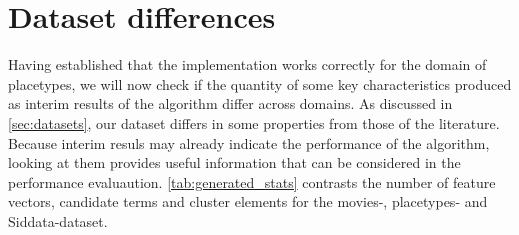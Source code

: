 \begin{table}[H]
	\label{tab:f1_geonames_foursquare_all}
\end{table}






\vspace{-0.4ex}
\section{Dataset differences} %
\label{sec:results_datasetdiffs}
\vspace{0.3ex}

Having established that the implementation works correctly for the domain of placetypes, we will now check if the quantity of some key characteristics produced as interim results of the algorithm differ across domains. As discussed in \autoref{sec:datasets}, our dataset differs in some properties from those of the literature. Because interim resuls may already indicate the performance of the algorithm, looking at them provides useful information that can be considered in the performance evaluaution. \autoref{tab:generated_stats} contrasts the number of feature vectors, candidate terms and cluster elements for the movies-, placetypes- and Siddata-dataset.

